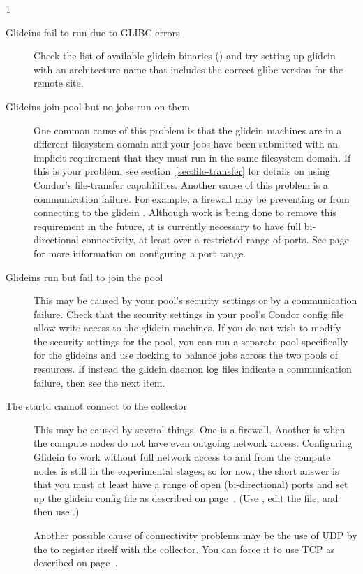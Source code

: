 \begin{ManPage}{\label{man-condor-glidein}}{1}
\begin{description}
\item[Glideins fail to run due to GLIBC errors] Check the list of
available glidein binaries
() and try setting
up glidein with an architecture name that includes the correct glibc
version for the remote site.

\item[Glideins join pool but no jobs run on them] One common
cause of this problem is that the glidein machines are in a different
filesystem domain and your jobs have been submitted with an implicit
requirement that they must run in the same filesystem domain.  If this
is your problem, see section~\ref{sec:file-transfer} for details on
using Condor's file-transfer capabilities.  Another cause of this
problem is a communication failure.  For example, a firewall may be
preventing  or  from connecting to
the glidein .  Although work is being done to remove
this requirement in the future, it is currently necessary to have full
bi-directional connectivity, at least over a restricted range of
ports.  See page~\pageref{param:HighPort} for more information on
configuring a port range.

\item[Glideins run but fail to join the pool] This may be caused by
your pool's security settings or by a communication failure.  Check
that the security settings in your pool's Condor config file allow
write access to the glidein machines.  If you do not wish to modify
the security settings for the pool, you can run a separate pool
specifically for the glideins and use flocking to balance jobs across
the two pools of resources.  If instead the glidein daemon log files
indicate a communication failure, then see the next item.

\item[The startd cannot connect to the collector] This may be caused
by several things.  One is a firewall.  Another is when the compute
nodes do not have even outgoing network access.  Configuring Glidein
to work without full network access to and from the compute nodes is
still in the experimental stages, so for now, the short answer is that
you must at least have a range of open (bi-directional) ports and set
up the glidein config file as described on
page~\pageref{param:HighPort}.  (Use , edit the file,
and then use .)

Another possible cause of connectivity problems may be the use of UDP by
the  to register itself with the collector.  You can
force it to use TCP as described on
page~\pageref{param:UpdateCollectorWithTcp}.


\end{description}
\end{ManPage}
